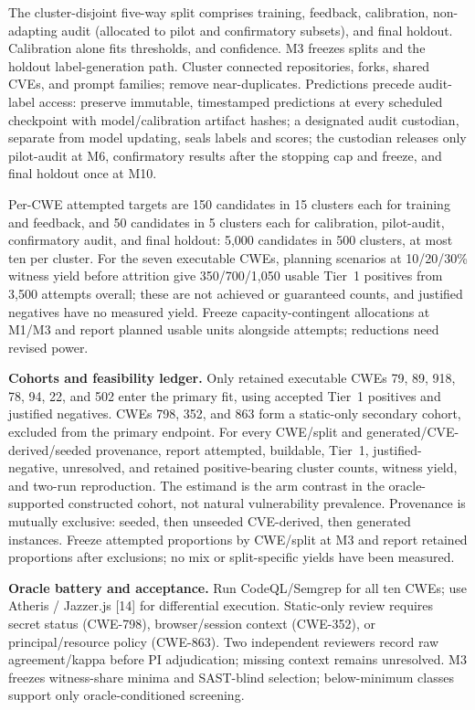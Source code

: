 \documentclass[11pt]{article}
\begin{document}
The cluster-disjoint five-way split comprises training, feedback, calibration, non-adapting audit (allocated to pilot and confirmatory subsets), and final holdout. Calibration alone fits thresholds, and confidence. M3 freezes splits and the holdout label-generation path. Cluster connected repositories, forks, shared CVEs, and prompt families; remove near-duplicates. Predictions precede audit-label access: preserve immutable, timestamped predictions at every scheduled checkpoint with model/calibration artifact hashes; a designated audit custodian, separate from model updating, seals labels and scores; the custodian releases only pilot-audit at M6, confirmatory results after the stopping cap and freeze, and final holdout once at M10.

Per-CWE attempted targets are 150 candidates in 15 clusters each for training and feedback, and 50 candidates in 5 clusters each for calibration, pilot-audit, confirmatory audit, and final holdout: 5,000 candidates in 500 clusters, at most ten per cluster. For the seven executable CWEs, planning scenarios at 10/20/30\% witness yield before attrition give 350/700/1,050 usable Tier~1 positives from 3,500 attempts overall; these are not achieved or guaranteed counts, and justified negatives have no measured yield. Freeze capacity-contingent allocations at M1/M3 and report planned usable units alongside attempts; reductions need revised power.

\textbf{Cohorts and feasibility ledger.} Only retained executable CWEs 79, 89, 918, 78, 94, 22, and 502 enter the primary fit, using accepted Tier~1 positives and justified negatives. CWEs 798, 352, and 863 form a static-only secondary cohort, excluded from the primary endpoint. For every CWE/split and generated/CVE-derived/seeded provenance, report attempted, buildable, Tier~1, justified-negative, unresolved, and retained positive-bearing cluster counts, witness yield, and two-run reproduction. The estimand is the arm contrast in the oracle-supported constructed cohort, not natural vulnerability prevalence. Provenance is mutually exclusive: seeded, then unseeded CVE-derived, then generated instances. Freeze attempted proportions by CWE/split at M3 and report retained proportions after exclusions; no mix or split-specific yields have been measured.

\textbf{Oracle battery and acceptance.} Run CodeQL/Semgrep for all ten CWEs; use Atheris / Jazzer.js [14] for differential execution. Static-only review requires secret status (CWE-798), browser/session context (CWE-352), or principal/resource policy (CWE-863). Two independent reviewers record raw agreement/kappa before PI adjudication; missing context remains unresolved. M3 freezes witness-share minima and SAST-blind selection; below-minimum classes support only oracle-conditioned screening.
\end{document}
